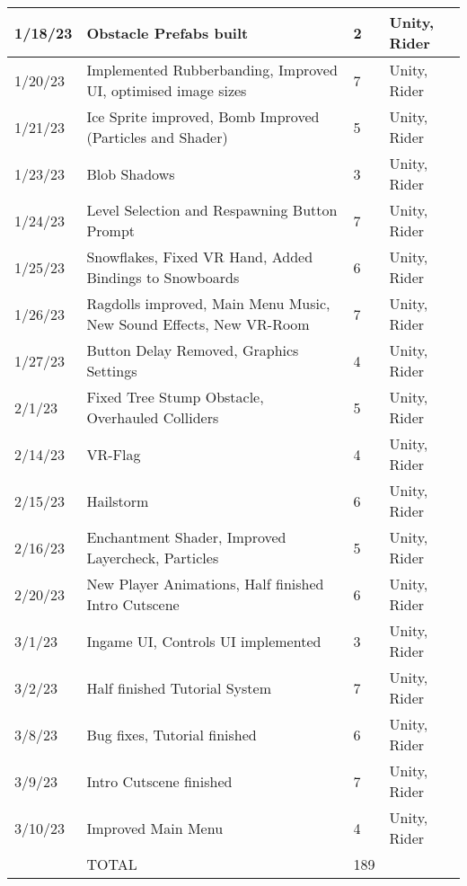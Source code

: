 \begin{longtable}{|p{1.5cm}|p{6cm}|p{1.2cm}|p{2.7cm}|}
	1/18/23 & Obstacle Prefabs built & 2 & Unity, Rider \\ \hline
	1/20/23 & Implemented Rubberbanding, Improved UI, optimised image sizes & 7 & Unity, Rider \\ \hline
	1/21/23 & Ice Sprite improved, Bomb Improved (Particles and Shader) & 5 & Unity, Rider \\ \hline
	1/23/23 & Blob Shadows & 3 & Unity, Rider \\ \hline
	1/24/23 & Level Selection and Respawning Button Prompt & 7 & Unity, Rider \\ \hline
	1/25/23 & Snowflakes, Fixed VR Hand, Added Bindings to Snowboards & 6 & Unity, Rider \\ \hline
	1/26/23 & Ragdolls improved, Main Menu Music, New Sound Effects, New VR-Room & 7 & Unity, Rider \\ \hline
	1/27/23 & Button Delay Removed, Graphics Settings & 4 & Unity, Rider \\ \hline
	2/1/23 & Fixed Tree Stump Obstacle, Overhauled Colliders & 5 & Unity, Rider \\ \hline
	2/14/23 & VR-Flag & 4 & Unity, Rider \\ \hline
	2/15/23 & Hailstorm & 6 & Unity, Rider \\ \hline
	2/16/23 & Enchantment Shader, Improved Layercheck, Particles & 5 & Unity, Rider \\ \hline
	2/20/23 & New Player Animations, Half finished Intro Cutscene & 6 & Unity, Rider \\ \hline
	3/1/23 & Ingame UI, Controls UI implemented & 3 & Unity, Rider \\ \hline
	3/2/23 & Half finished Tutorial System & 7 & Unity, Rider \\ \hline
	3/8/23 & Bug fixes, Tutorial finished & 6 & Unity, Rider \\ \hline
	3/9/23 & Intro Cutscene finished & 7 & Unity, Rider \\ \hline
	3/10/23 & Improved Main Menu & 4 & Unity, Rider \\ \hline
	~ & TOTAL & 189 & ~ \\ \hline
\end{longtable}